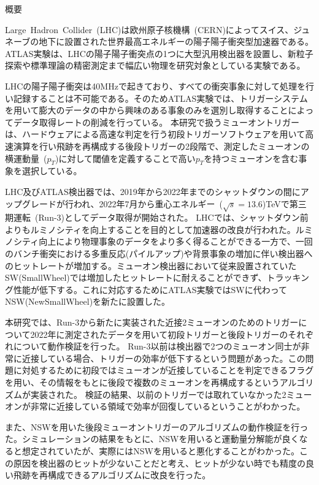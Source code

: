 \begin{center}
  \begin{huge}
    概要
  \end{huge}
\end{center}

\vspace{10pt}

Large~Hadron~Collider~(LHC)は欧州原子核機構~(CERN)によってスイス、ジュネーブの地下に設置された世界最高エネルギーの陽子陽子衝突型加速器である。ATLAS実験は、LHCの陽子陽子衝突点の1つに大型汎用検出器を設置し、新粒子探索や標準理論の精密測定まで幅広い物理を研究対象としている実験である。


LHCの陽子陽子衝突は40MHzで起きており、すべての衝突事象に対して処理を行い記録することは不可能である。そのためATLAS実験では、トリガーシステムを用いて膨大のデータの中から興味のある事象のみを選別し取得することによってデータ取得レートの削減を行っている。
本研究で扱うミューオントリガーは、ハードウェアによる高速な判定を行う初段トリガーソフトウェアを用いて高速演算を行い飛跡を再構成する後段トリガーの2段階で、測定したミューオンの横運動量~($p_{T}$)に対して閾値を定義することで高い$p_{T}$を持つミューオンを含む事象を選択している。


LHC及びATLAS検出器では、2019年から2022年までのシャットダウンの間にアップグレードが行われ、2022年7月から重心エネルギー~($\sqrt{s}=13.6$)TeVで第三期運転~(Run-3)としてデータ取得が開始された。
LHCでは、シャットダウン前よりもルミノシティを向上することを目的として加速器の改良が行われた。ルミノシティ向上により物理事象のデータをより多く得ることができる一方で、一回のバンチ衝突における多重反応(パイルアップ)や背景事象の増加に伴い検出器へのヒットレートが増加する。ミューオン検出器において従来設置されていたSW(SmallWheel)では増加したヒットレートに耐えることができず、トラッキング性能が低下する。これに対応するためにATLAS実験ではSWに代わってNSW(NewSmallWheel)を新たに設置した。

本研究では、Run-3から新たに実装された近接2ミューオンのためのトリガーについて2022年に測定されたデータを用いて初段トリガーと後段トリガーのそれぞれについて動作検証を行った。
Run-3以前は検出器で2つのミューオン同士が非常に近接している場合、トリガーの効率が低下するという問題があった。この問題に対処するために初段ではミューオンが近接していることを判定できるフラグを用い、その情報をもとに後段で複数のミューオンを再構成するというアルゴリズムが実装された。
検証の結果、以前のトリガーでは取れていなかった2ミューオンが非常に近接している領域で効率が回復しているということがわかった。


また、NSWを用いた後段ミューオントリガーのアルゴリズムの動作検証を行った。シミュレーションの結果をもとに、NSWを用いると運動量分解能が良くなると想定されていたが、実際にはNSWを用いると悪化することがわかった。この原因を検出器のヒットが少ないことだと考え、ヒットが少ない時でも精度の良い飛跡を再構成できるアルゴリズムに改良を行った。